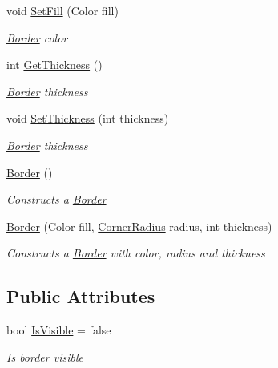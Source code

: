 \begin{DoxyCompactItemize}
void \mbox{\hyperlink{class_space_v_i_l_1_1_decorations_1_1_border_ae5a1f4bd813bcfcdb5d98a5858da6c86}{Set\+Fill}} (Color fill)
\begin{DoxyCompactList}\small\item\em \mbox{\hyperlink{class_space_v_i_l_1_1_decorations_1_1_border}{Border}} color \end{DoxyCompactList}\item 
int \mbox{\hyperlink{class_space_v_i_l_1_1_decorations_1_1_border_a0ec556844cb733cab7ad11bef7cbcac1}{Get\+Thickness}} ()
\begin{DoxyCompactList}\small\item\em \mbox{\hyperlink{class_space_v_i_l_1_1_decorations_1_1_border}{Border}} thickness \end{DoxyCompactList}\item 
void \mbox{\hyperlink{class_space_v_i_l_1_1_decorations_1_1_border_aa6c20c4eafe53ebeac542ec35cc2239c}{Set\+Thickness}} (int thickness)
\begin{DoxyCompactList}\small\item\em \mbox{\hyperlink{class_space_v_i_l_1_1_decorations_1_1_border}{Border}} thickness \end{DoxyCompactList}\item 
\mbox{\hyperlink{class_space_v_i_l_1_1_decorations_1_1_border_af401ed881c34ee207e39331b96545211}{Border}} ()
\begin{DoxyCompactList}\small\item\em Constructs a \mbox{\hyperlink{class_space_v_i_l_1_1_decorations_1_1_border}{Border}} \end{DoxyCompactList}\item 
\mbox{\hyperlink{class_space_v_i_l_1_1_decorations_1_1_border_a11c41056821fcf5455863b0009127d2e}{Border}} (Color fill, \mbox{\hyperlink{class_space_v_i_l_1_1_decorations_1_1_corner_radius}{Corner\+Radius}} radius, int thickness)
\begin{DoxyCompactList}\small\item\em Constructs a \mbox{\hyperlink{class_space_v_i_l_1_1_decorations_1_1_border}{Border}} with color, radius and thickness \end{DoxyCompactList}\end{DoxyCompactItemize}
\subsection*{Public Attributes}
\begin{DoxyCompactItemize}
\item 
bool \mbox{\hyperlink{class_space_v_i_l_1_1_decorations_1_1_border_a47746be2515f5c1e5164836c42665bac}{Is\+Visible}} = false
\begin{DoxyCompactList}\small\item\em Is border visible \end{DoxyCompactList}\end{DoxyCompactItemize}


